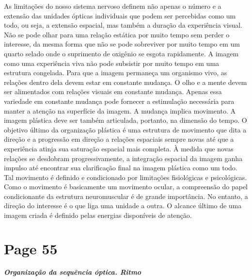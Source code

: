\documentclass[a4paper]{article}
\begin{document}
As limitações do nosso sistema nervoso definem não apenas o número e a extensão das unidades ópticas individuais que podem ser percebidas como um todo, ou seja, a extensão espacial, mas também a duração da experiência visual. Não se pode olhar para uma relação estática por muito tempo sem perder o interesse, da mesma forma que não se pode sobreviver por muito tempo em um quarto selado onde o suprimento de oxigênio se esgota rapidamente. A imagem como uma experiência viva não pode subsistir por muito tempo em uma estrutura congelada. Para que a imagem permaneça um organismo vivo, as relações dentro dela devem estar em constante mudança. O olho e a mente devem ser alimentados com relações visuais em constante mudança. Apenas essa variedade em constante mudança pode fornecer a estimulação necessária para manter a atenção na superfície da imagem. A mudança implica movimento. A imagem plástica deve ser também articulada, portanto, na dimensão do tempo. O objetivo último da organização plástica é uma estrutura de movimento que dita a direção e a progressão em direção a relações espaciais sempre novas até que a experiência atinja sua saturação espacial mais completa. À medida que novas relações se desdobram progressivamente, a integração espacial da imagem ganha impulso até encontrar sua clarificação final na imagem plástica como um todo. Tal movimento é definido e condicionado por limitações fisiológicas e psicológicas. Como o movimento é basicamente um movimento ocular, a compreensão do papel condicionante da estrutura neuromuscular é de grande importância. No entanto, a direção do interesse é o que liga uma unidade a outra. O alcance último de uma imagem criada é definido pelas energias disponíveis de atenção.

\vspace*{\fill}

\newpage
\section*{Page 55}

\noindent\textit{\textbf{Organização da sequência óptica. Ritmo}}
\end{document}
